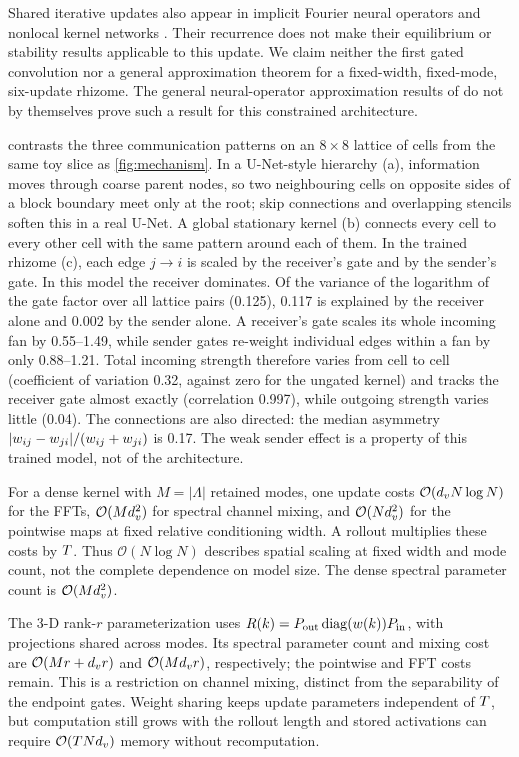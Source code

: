 Shared iterative updates also appear in implicit Fourier neural operators and nonlocal kernel networks \citep{you2022ifno,you2022nkn}. Their recurrence does not make their equilibrium or stability results applicable to this update. We claim neither the first gated convolution nor a general approximation theorem for a fixed-width, fixed-mode, six-update rhizome. The general neural-operator approximation results of \citet{kovachki2023neural} do not by themselves prove such a result for this constrained architecture.

 contrasts the three communication patterns on an $8\times8$ lattice of cells from the same toy slice as \cref{fig:mechanism}. In a U-Net-style hierarchy (a), information moves through coarse parent nodes, so two neighbouring cells on opposite sides of a block boundary meet only at the root; skip connections and overlapping stencils soften this in a real U-Net. A global stationary kernel (b) connects every cell to every other cell with the same pattern around each of them. In the trained rhizome (c), each edge $j\to i$ is scaled by the receiver's gate and by the sender's gate. In this model the receiver dominates. Of the variance of the logarithm of the gate factor over all lattice pairs (0.125), 0.117 is explained by the receiver alone and 0.002 by the sender alone. A receiver's gate scales its whole incoming fan by 0.55--1.49, while sender gates re-weight individual edges within a fan by only 0.88--1.21. Total incoming strength therefore varies from cell to cell (coefficient of variation 0.32, against zero for the ungated kernel) and tracks the receiver gate almost exactly (correlation 0.997), while outgoing strength varies little (0.04). The connections are also directed: the median asymmetry $\lvert w_{ij}-w_{ji}\rvert/(w_{ij}+w_{ji})$ is 0.17. The weak sender effect is a property of this trained model, not of the architecture.


For a dense kernel with $M=|\Lambda|$ retained modes, one update costs $\mathcal{O}(d_v N\log N)$ for the FFTs, $\mathcal{O}(Md_v^2)$ for spectral channel mixing, and $\mathcal{O}(Nd_v^2)$ for the pointwise maps at fixed relative conditioning width. A rollout multiplies these costs by $T$. Thus $\mathcal{O}(N\log N)$ describes spatial scaling at fixed width and mode count, not the complete dependence on model size. The dense spectral parameter count is $\mathcal{O}(Md_v^2)$.

The 3-D rank-$r$ parameterization uses $R(k)=P_{\mathrm{out}}\operatorname{diag}(w(k))P_{\mathrm{in}}$, with projections shared across modes. Its spectral parameter count and mixing cost are $\mathcal{O}(Mr+d_v r)$ and $\mathcal{O}(Md_v r)$, respectively; the pointwise and FFT costs remain. This is a restriction on channel mixing, distinct from the separability of the endpoint gates. Weight sharing keeps update parameters independent of $T$, but computation still grows with the rollout length and stored activations can require $\mathcal{O}(T Nd_v)$ memory without recomputation.
